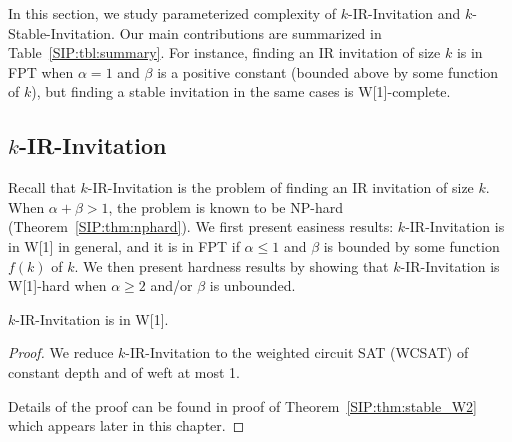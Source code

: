 In this section, we study parameterized complexity of $k$-IR-Invitation and $k$-Stable-Invitation.
Our main contributions are summarized in Table~\ref{SIP:tbl:summary}. For instance, finding an IR invitation of size $k$ is in FPT when $\alpha = 1$ and $\beta$ is a positive constant (bounded above by some function of $k$), but finding a stable invitation in the same cases is W[1]-complete. 
 

\subsection{$k$-IR-Invitation}

Recall that $k$-IR-Invitation is the problem of finding an IR invitation of size $k$.
When $\alpha + \beta > 1$, the problem is known to be NP-hard (Theorem~\ref{SIP:thm:nphard}). 
We first present easiness results: $k$-IR-Invitation is in W[1] in general, and it is in FPT if $\alpha \leq 1$ and $\beta$ is bounded by some function $f(k)$ of $k$.
We then present hardness results by showing that $k$-IR-Invitation is W[1]-hard when $\alpha \geq 2$ and/or $\beta$ is unbounded.


\begin{theorem} \label{SIP:thm:IR_invitation_W1}
	$k$-IR-Invitation is in W[1].
\end{theorem} 
\begin{proof}
	We reduce $k$-IR-Invitation to the weighted circuit SAT (WCSAT) of constant depth and of weft at most 1. 
	
	Details of the proof can be found in proof of Theorem~\ref{SIP:thm:stable_W2} which appears later in this chapter.
\end{proof}


